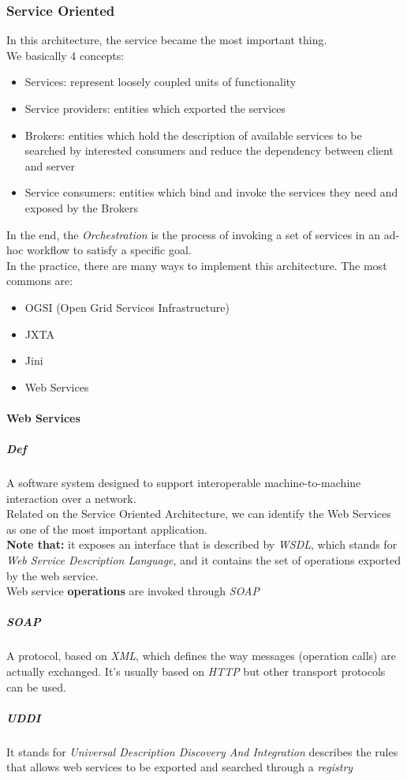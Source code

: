\documentclass{article}
\begin{document}
    \subsubsection{Service Oriented}
    In this architecture, the service became the most important thing.\\
    We basically 4 concepts:
    \begin{itemize}
        \item Services: represent loosely coupled units of functionality
        \item Service providers: entities which exported the services
        \item Brokers: entities which hold the description of available 
                services to be searched by interested consumers and reduce the
                dependency between client and server
        \item Service consumers: entities which bind and invoke the services
                they need and exposed by the Brokers
    \end{itemize}
    In the end, the \textit{Orchestration} is the process of invoking a set
    of services in an ad-hoc workflow to satisfy a specific goal.\\
    In the practice, there are many ways to implement this architecture.
    The most commons are:
    \begin{itemize}
        \item OGSI (Open Grid Services Infrastructure)
        \item JXTA
        \item Jini
        \item Web Services
    \end{itemize}
    
    \paragraph{Web Services}
    \subparagraph{Def}
    A software system designed to support interoperable machine-to-machine
    interaction over a network.\\
    Related on the Service Oriented Architecture, we can identify
    the Web Services as one of the most important application.\\
    \textbf{Note that:} it exposes an interface that is described by \textit{WSDL},
    which stands for \textit{Web Service Description Language}, and it
    contains the set of operations exported by the web service.\\
    Web service \textbf{operations} are invoked through \textit{SOAP}
    \subparagraph{SOAP}
    A protocol, based on \textit{XML}, which defines the way messages
    (operation calls) are actually exchanged. It's usually based on \textit{HTTP}
    but other transport protocols can be used.
    \subparagraph{UDDI}
    It stands for \textit{Universal Description Discovery And Integration}
    describes the rules that allows web services to be exported and searched
    through a \textit{registry}
\end{document}
